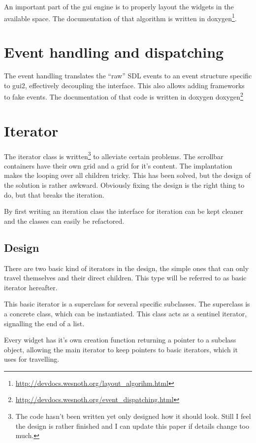 \documentclass[a4paper,notitlepage]{report}
\begin{document}
An important part of the gui engine is to properly layout the widgets in the
available space. The documentation of that algorithm is written in
doxygen\footnote{\url{http://devdocs.wesnoth.org/layout\_algorihm.html}}.

\section{Event handling and dispatching}
\label{event_handling}

The event handling translates the ``raw'' SDL events to an event structure
specific to gui2, effectively decoupling the interface. This also allows adding
frameworks to fake events. The documentation of that code is written in doxygen
doxygen\footnote{\url{http://devdocs.wesnoth.org/event_dispatching.html}}

\section{Iterator}

The iterator class is written\footnote{The code hasn't been written yet only
designed how it should look. Still I feel the design is rather finished and I
can update this paper if details change too much.} to alleviate certain
problems. The scrollbar containers have their own grid and a grid for it's
content. The implantation makes the looping over all children tricky. This has
been solved, but the design of the solution is rather awkward. Obviously fixing
the design is the right thing to do, but that breaks the iteration.

By first writing an iteration class the interface for iteration can be kept
cleaner and the classes can easily be refactored.

\subsection{Design}

There are two basic kind of iterators in the design, the simple ones that can
only travel themselves and their direct children. This type will be referred to
as basic iterator hereafter. 

This basic iterator is a superclass for several specific subclasses. The
superclass is a concrete class, which can be instantiated. This class acts as a
sentinel iterator, signalling the end of a list.

Every widget has it's own creation function returning a pointer to a subclass
object, allowing the main iterator to keep pointers to basic iterators, which it
uses for travelling.
\end{document}
